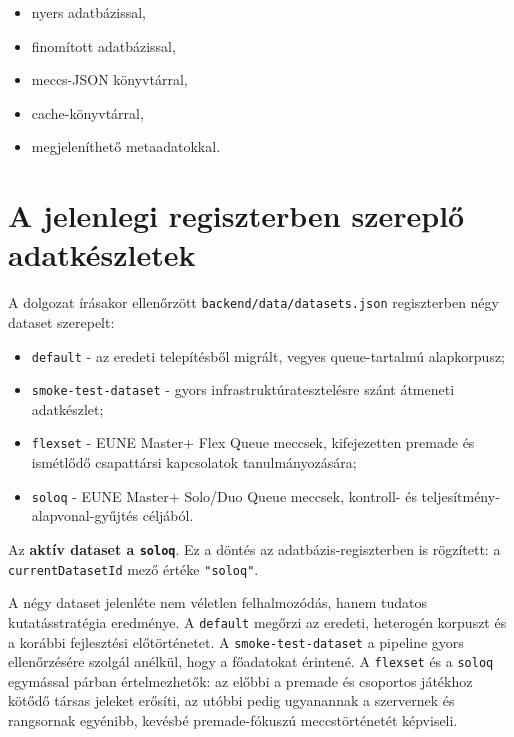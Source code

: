 ﻿\documentclass[a4paper,12pt]{report}
\begin{document}
\begin{itemize}
    \item nyers adatbázissal,
    \item finomított adatbázissal,
    \item meccs-JSON könyvtárral,
    \item cache-könyvtárral,
    \item megjeleníthető metaadatokkal.
\end{itemize}

\section{A jelenlegi regiszterben szereplő adatkészletek}

A dolgozat írásakor ellenőrzött \texttt{backend/data/datasets.json} regiszterben négy dataset szerepelt:

\begin{itemize}
    \item \texttt{default} - az eredeti telepítésből migrált, vegyes queue-tartalmú alapkorpusz;
    \item \texttt{smoke-test-dataset} - gyors infrastruktúratesztelésre szánt átmeneti adatkészlet;
    \item \texttt{flexset} - EUNE Master$+$ Flex Queue meccsek, kifejezetten premade és ismétlődő csapattársi kapcsolatok tanulmányozására;
    \item \texttt{soloq} - EUNE Master$+$ Solo/Duo Queue meccsek, kontroll- és teljesítmény-alapvonal-gyűjtés céljából.
\end{itemize}

Az \textbf{aktív dataset a \texttt{soloq}}. Ez a döntés az adatbázis-regiszterben is rögzített: a \texttt{currentDatasetId} mező értéke \texttt{"soloq"}.

A négy dataset jelenléte nem véletlen felhalmozódás, hanem tudatos kutatásstratégia eredménye. A \texttt{default} megőrzi az eredeti, heterogén korpuszt és a korábbi fejlesztési előtörténetet. A \texttt{smoke-test-dataset} a pipeline gyors ellenőrzésére szolgál anélkül, hogy a főadatokat érintené. A \texttt{flexset} és a \texttt{soloq} egymással párban értelmezhetők: az előbbi a premade és csoportos játékhoz kötődő társas jeleket erősíti, az utóbbi pedig ugyanannak a szervernek és rangsornak egyénibb, kevésbé premade-fókuszú meccstörténetét képviseli.
\end{document}

